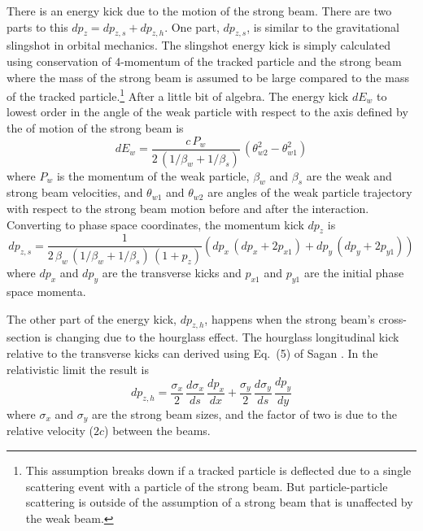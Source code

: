 There is an energy kick due to the motion of the strong beam. There are two parts to this $dp_z =
dp_{z,s} + dp_{z,h}$. One part, $dp_{z,s}$, is similar to the gravitational slingshot in orbital
mechanics. The slingshot energy kick is simply calculated using conservation of 4-momentum of the
tracked particle and the strong beam where the mass of the strong beam is assumed to be large
compared to the mass of the tracked particle.\footnote
  {
This assumption breaks down if a tracked particle is deflected due to a single scattering event with
a particle of the strong beam.  But particle-particle scattering is outside of the assumption of a
strong beam that is unaffected by the weak beam.
  }
After a little bit of algebra. The energy kick $dE_w$ to lowest order in the angle of the weak
particle with respect to the axis defined by the of motion of the strong beam is
\begin{equation}
  dE_w = \frac{c \, P_w}{2 \, (1/\beta_w + 1/\beta_s)} \, \left( \theta_{w2}^2 - \theta_{w1}^2 \right)
\end{equation}
where $P_w$ is the momentum of the weak particle, $\beta_w$ and $\beta_s$ are the weak and strong
beam velocities, and $\theta_{w1}$ and $\theta_{w2}$ are angles of the weak particle trajectory with
respect to the strong beam motion before and after the interaction. Converting to phase space
coordinates, the momentum kick $dp_z$ is
\begin{equation}
  dp_{z,s} = \frac{1}{2 \, \beta_w \, (1/\beta_w + 1/\beta_s) \, (1 + p_z)} 
    \left( dp_x \, (dp_x + 2p_{x1}) + dp_y \, (dp_y + 2p_{y1}) \right)
    \label{dpz12}
\end{equation}
where $dp_x$ and $dp_y$ are the transverse kicks and $p_{x1}$ and $p_{y1}$ are the initial phase
space momenta.

The other part of the energy kick, $dp_{z,h}$, happens when the strong beam's cross-section is changing due to
the hourglass effect. The hourglass longitudinal kick relative to the transverse kicks can derived using
Eq.~(5) of Sagan \cite{b:beamion}. In the relativistic limit the result is
\begin{equation}
  dp_{z,h} = \frac{\sigma_x}{2} \, \frac{d\sigma_x}{ds} \, \frac{dp_x}{dx} + 
             \frac{\sigma_y}{2} \, \frac{d\sigma_y}{ds} \, \frac{dp_y}{dy}
  \label{dpzsx}
\end{equation}
where $\sigma_x$ and $\sigma_y$ are the strong beam sizes, and the factor of two is due to the
relative velocity ($2c$) between the beams.

